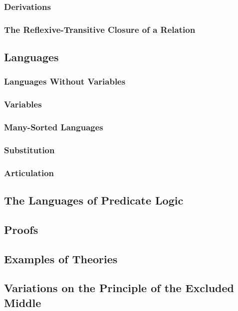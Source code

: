 \subsubsection{Derivations}
\subsubsection{The Reflexive-Transitive Closure of a Relation}


\subsection{Languages}

\subsubsection{Languages Without Variables}
\subsubsection{Variables}
\subsubsection{Many-Sorted Languages}
\subsubsection{Substitution}
\subsubsection{Articulation}


\subsection{The Languages of Predicate Logic}


\subsection{Proofs}


\subsection{Examples of Theories}


\subsection{Variations on the Principle of the Excluded Middle}
